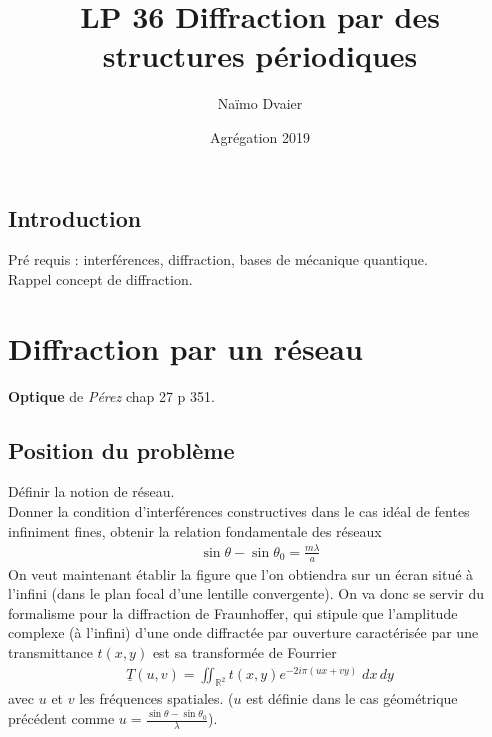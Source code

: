 \documentclass[12pt,prb,aps,epsf]{article}
\begin{document}
	
	\title{LP 36 Diffraction par des structures périodiques}
	\author{Naïmo Dvaier}
	\date{Agrégation 2019}
	
	\maketitle
	
	\tableofcontents
	
	\pagebreak
	
\subsection{Introduction}
Pré requis : interférences, diffraction, bases de mécanique quantique.\\
Rappel concept de diffraction.
\section{Diffraction par un réseau}
\textbf{Optique} de \textit{Pérez} chap 27 p 351.

\subsection{Position du problème}
Définir la notion de réseau.\\ 
Donner la condition d'interférences constructives dans le cas idéal de fentes infiniment fines, obtenir la relation fondamentale des réseaux
\begin{eqnarray}
\sin \theta - \sin \theta_0 = \frac{m\lambda}{a}
\end{eqnarray}
On veut maintenant établir la figure que l'on obtiendra sur un écran situé à l'infini (dans le plan focal d'une lentille convergente). On va donc se servir du formalisme pour la diffraction de Fraunhoffer, qui stipule que l'amplitude complexe (à l'infini) d'une onde diffractée par ouverture caractérisée par une transmittance $t(x,y)$ est sa transformée de Fourrier
\begin{eqnarray}
\underline{T} (u,v) = \iint_{\mathbb{R}^2} t(x,y) e^{-2i\pi(ux+vy)}\; dx\,dy
\end{eqnarray}
avec $u$ et $v$ les fréquences spatiales. ($u$ est définie dans le cas géométrique précédent comme $u = \frac{\sin\theta - \sin\theta_0}{\lambda}$).
\end{document}
